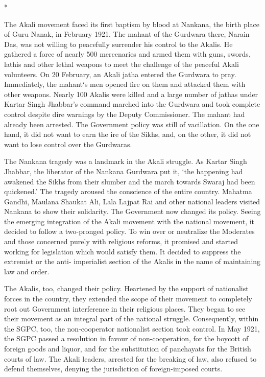 \begin{center}*\end{center}



The Akali movement faced its first baptism by blood at Nankana, the birth place of Guru Nanak, in February 1921. The mahant of the Gurdwara there, Narain Das, was not willing to peacefully surrender his control to the Akalis. He gathered a force of nearly 500 mercenaries and armed them with guns, swords, lathis and other lethal weapons to meet the challenge of the peaceful Akali volunteers. On 20 February, an Akali jatha entered the Gurdwara to pray. Immediately, the mahant‘s men opened fire on them and attacked them with other weapons. Nearly 100 Akalis were killed and a large number of jathas under Kartar Singh Jhabbar’s command marched into the Gurdwara and took complete control despite dire warnings by the Deputy Commissioner. The mahant had already been arrested. The Government policy was still of vacillation. On the one hand, it did not want to earn the ire of the Sikhs, and, on the other, it did not want to lose control over the Gurdwaras.

The Nankana tragedy was a landmark in the Akali struggle. As Kartar Singh Jhabbar, the liberator of the Nankana Gurdwara put it, ‘the happening had awakened the Sikhs from their slumber and the march towards Swaraj had been quickened.’ The tragedy aroused the conscience of the entire country. Mahatma Gandhi, Maulana Shaukat Ali, Lala Lajpat Rai and other national leaders visited Nankana to show their solidarity. The Government now changed its policy. Seeing the emerging integration of the Akali movement with the national movement, it decided to follow a two-pronged policy. To win over or neutralize the Moderates and those concerned purely with religious reforms, it promised and started working for legislation which would satisfy them. It decided to suppress the extremist or the anti- imperialist section of the Akalis in the name of maintaining law and order.

The Akalis, too, changed their policy. Heartened by the support of nationalist forces in the country, they extended the scope of their movement to completely root out Government interference in their religious places. They began to see their movement as an integral part of the national struggle. Consequently, within the SGPC, too, the non-cooperator nationalist section took control. In May 1921, the SGPC passed a resolution in favour of non-cooperation, for the boycott of foreign goods and liquor, and for the substitution of panchayats for the British courts of law. The Akali leaders, arrested for the breaking of law, also refused to defend themselves, denying the jurisdiction of foreign-imposed courts.

